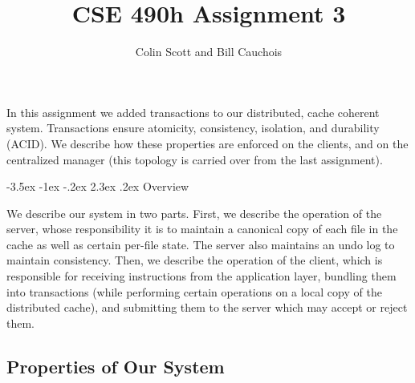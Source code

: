 \documentclass[12pt]{article}
\title{CSE 490h Assignment 3}
\author{
Colin Scott and Bill Cauchois \\
}
\makeatletter
\renewcommand\section{\@startsection{section}{1}{\z@}%
								 {-3.5ex \@plus -1ex \@minus -.2ex}%
								 {2.3ex \@plus.2ex}%
								 {\normalfont\large\bfseries}}
\makeatother
\begin{document}
\maketitle

In this assignment we added transactions to our distributed, cache coherent system. Transactions ensure atomicity, consistency, isolation, and durability (ACID). We describe how these properties are enforced on the clients, and on the centralized manager (this topology is carried over from the last assignment).

\section{Overview}

We describe our system in two parts. First, we describe the operation of the server, whose responsibility it is to maintain a canonical copy of each file in the cache as well as certain per-file state. The server also maintains an undo log to maintain consistency. Then, we describe the operation of the client, which is responsible for receiving instructions from the application layer, bundling them into transactions (while performing certain operations on a local copy of the distributed cache), and submitting them to the server which may accept or reject them.

\subsection{Properties of Our System}
\end{document}
